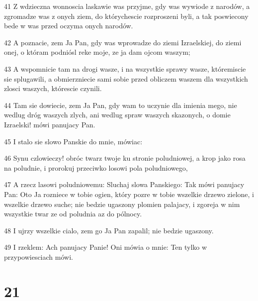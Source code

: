 \par 41 Z wdzieczna wonnoscia laskawie was przyjme, gdy was wywiode z narodów, a zgromadze was z onych ziem, do którychescie rozproszeni byli, a tak poswiecony bede w was przed oczyma onych narodów.
\par 42 A poznacie, zem Ja Pan, gdy was wprowadze do ziemi Izraelskiej, do ziemi onej, o któram podniósl reke moje, ze ja dam ojcom waszym;
\par 43 A wspomnicie tam na drogi wasze, i na wszystkie sprawy wasze, któremiscie sie splugawili, a obmierzniecie sami sobie przed obliczem waszem dla wszystkich zlosci waszych, którescie czynili.
\par 44 Tam sie dowiecie, zem Ja Pan, gdy wam to uczynie dla imienia mego, nie wedlug dróg waszych zlych, ani wedlug spraw waszych skazonych, o domie Izraelski! mówi panujacy Pan.
\par 45 I stalo sie slowo Panskie do mnie, mówiac:
\par 46 Synu czlowieczy! obróc twarz twoje ku stronie poludniowej, a krop jako rosa na poludnie, i prorokuj przeciwko losowi pola poludniowego,
\par 47 A rzecz lasowi poludniowemu: Sluchaj slowa Panskiego: Tak mówi panujacy Pan: Oto Ja rozniece w tobie ogien, który pozre w tobie wszelkie drzewo zielone, i wszelkie drzewo suche; nie bedzie ugaszony plomien palajacy, i zgoreja w nim wszystkie twar ze od poludnia az do pólnocy.
\par 48 I ujrzy wszelkie cialo, zem go Ja Pan zapalil; nie bedzie ugaszony.
\par 49 I rzeklem: Ach panujacy Panie! Oni mówia o mnie: Ten tylko w przypowiesciach mówi.

\chapter{21}

